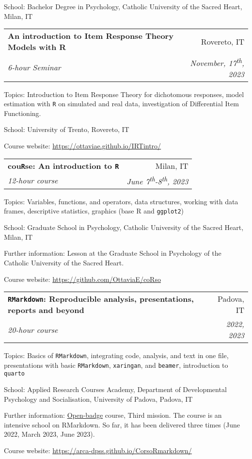 \documentclass[letterpaper,12pt]{article}
\makeatletter
\newcommand{\resumeSubheading}[4]{
  \vspace{-1pt}\item
    \begin{tabular*}{0.97\textwidth}{l@{\extracolsep{\fill}}r}
      \textbf{#1} & #2 \\
      \textit{\small#3} & \textit{\small #4} \\
    \end{tabular*}\vspace{-5pt}
}
\makeatother
\begin{document}
{\small School: Bachelor Degree in Psychology, Catholic University of the Sacred Heart, Milan, IT} 

\resumeSubheading {An introduction to Item Response Theory Models with R}{Rovereto, IT}{6-hour Seminar}{November, 17\textsuperscript{th}, 2023}

{\small Topics: Introduction to Item Response Theory for dichotomous responses, model estimation with \texttt{R} on simulated and real data, investigation of Differential Item Functioning. }

{\small School: University of Trento, Rovereto, IT} 


{\small Course website:  \href{https://ottaviae.github.io/IRTintro/}{https://ottaviae.github.io/IRTintro/}} 

\resumeSubheading {cou\texttt{R}se: An introduction to \texttt{R}}{Milan, IT}{12-hour course}{\small{June 7\textsuperscript{th}-8\textsuperscript{th}, 2023}}

{\small Topics: Variables, functions, and operators, data structures, working with data frames, descriptive statistics, graphics (base R and \texttt{ggplot2})}

{\small School: Graduate School in Psychology, Catholic University of the Sacred Heart, Milan,  IT} 

{\small Further information: Lesson at the Graduate School in Psychology of the Catholic University of the Sacred Heart. }

{\small Course website:  \href{https://github.com/OttaviaE/coRso}{https://github.com/OttaviaE/coRso}} 


\resumeSubheading {\texttt{RMarkdown}: Reproducible analysis, presentations, reports and beyond}{Padova, IT}{20-hour course}{\small{ 2022,  2023}}

{\small Topics: Basics of \texttt{RMarkdown}, integrating code, analysis, and text in one file, presentations with basic \texttt{RMarkdown}, \texttt{xaringan}, and \texttt{beamer}, introduction to \texttt{quarto}}

{\small School: Applied Research Courses Academy, Department of Developmental Psychology and Socialisation, University of Padova, Padova, IT} 

{\small Further information: \href{https://bestr.it/badge/show/3657}{Open-badge} course, Third mission. The course is an intensive school on RMarkdown. So far, it has been delivered three times (June 2022, March 2023, June 2023). } 

{\small Course website: \href{https://arca-dpss.github.io/CorsoRmarkdown/}{https://arca-dpss.github.io/CorsoRmarkdown/}}
\end{document}
